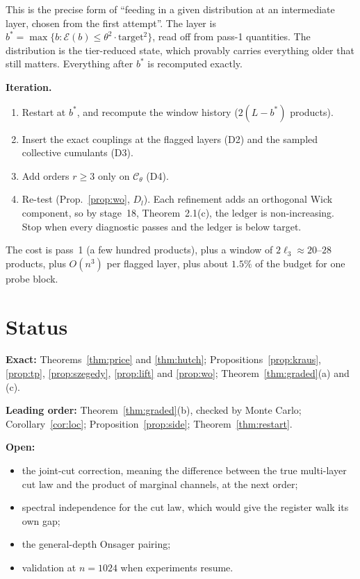 This is the precise form of ``feeding in a given distribution at an intermediate layer, chosen from the
first attempt''. The layer is $b^*=\max\{b:\mathcal E(b)\le\theta^2\cdot\text{target}^2\}$, read off from pass-1 quantities. The
distribution is the tier-reduced state, which provably carries everything older that still matters.
Everything after $b^*$ is recomputed exactly.

\noindent\textbf{Iteration.}
\begin{enumerate}[label=\roman*.,leftmargin=1.6em,itemsep=0pt,topsep=1pt]
\item Restart at $b^*$, and recompute the window history ($2(L-b^*)$ products).
\item Insert the exact couplings at the flagged layers (D2) and the sampled collective cumulants (D3).
\item Add orders $r\ge3$ only on $\mathcal C_\theta$ (D4).
\item Re-test (Prop.~\ref{prop:wo}, $D_l$). Each refinement adds an orthogonal Wick component, so by stage~18,
Theorem~2.1(c), the ledger is non-increasing. Stop when every diagnostic passes and the ledger is below
target.
\end{enumerate}
The cost is pass~1 (a few hundred products), plus a window of $2\ell_3\approx20$--$28$ products, plus $O(n^3)$ per flagged
layer, plus about $1.5\%$ of the budget for one probe block.

\section*{Status}
\noindent\textbf{Exact:} Theorems~\ref{thm:price} and \ref{thm:hutch}; Propositions~\ref{prop:kraus}, \ref{prop:tp},
\ref{prop:szegedy}, \ref{prop:lift} and \ref{prop:wo}; Theorem~\ref{thm:graded}(a) and (c).

\noindent\textbf{Leading order:} Theorem~\ref{thm:graded}(b), checked by Monte Carlo; Corollary~\ref{cor:loc};
Proposition~\ref{prop:side}; Theorem~\ref{thm:restart}.

\noindent\textbf{Open:}
\begin{itemize}[leftmargin=1.2em,itemsep=0pt,topsep=1pt]
\item the joint-cut correction, meaning the difference between the true multi-layer cut law and the
product of marginal channels, at the next order;
\item spectral independence for the cut law, which would give the register walk its own gap;
\item the general-depth Onsager pairing;
\item validation at $n=1024$ when experiments resume.
\end{itemize}
